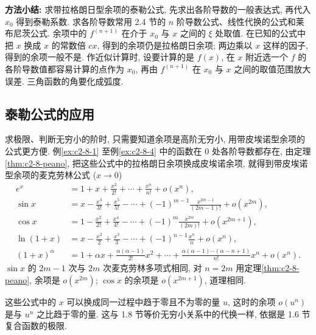 \documentclass[UTF8,openany]{ctexbook}
\theoremstyle{chinesetextbook}
\begin{document}
\par\indent\textbf{方法小结:} 求带拉格朗日型余项的泰勒公式, 先求出各阶导数的一般表达式, 再代入 $x_0$ 得到泰勒系数. 求各阶导数常用 2.4 节的 $n$ 阶导数公式、线性代换的公式和莱布尼茨公式. 余项中的 $f^{(n+1)}$ 在介于 $x_0$ 与 $x$ 之间的 $\xi$ 处取值. 在已知的公式中把 $x$ 换成 $x$ 的常数倍 $cx$, 得到的余项仍是拉格朗日余项; 两边乘以 $x$ 这样的因子, 得到的余项一般不是. 作近似计算时, 设要计算的是 $f(x)$, 在 $x$ 附近选一个 $f$ 的各阶导数值都容易计算的点作为 $x_0$, 再由 $f^{(n+1)}$ 在 $x_0$ 与 $x$ 之间的取值范围放大误差. 三角函数的角要化成弧度.
\subsection{泰勒公式的应用}
求极限、判断无穷小的阶时, 只需要知道余项是高阶无穷小, 用带皮埃诺型余项的公式更方便. 例\ref{ex:c2-8-1} 至例\ref{ex:c2-8-4} 中的函数在 $0$ 处各阶导数都存在, 由定理\ref{thm:c2-8-peano}, 把这些公式中的拉格朗日余项换成皮埃诺余项, 就得到带皮埃诺型余项的麦克劳林公式 ($x\to0$)
\[
\begin{aligned}
e^x&=1+x+\frac{x^2}{2!}+\cdots+\frac{x^n}{n!}+o(x^n),\\
\sin x&=x-\frac{x^3}{3!}+\frac{x^5}{5!}-\cdots+(-1)^{m-1}\frac{x^{2m-1}}{(2m-1)!}+o(x^{2m}),\\
\cos x&=1-\frac{x^2}{2!}+\frac{x^4}{4!}-\cdots+(-1)^m\frac{x^{2m}}{(2m)!}+o(x^{2m+1}),\\
\ln(1+x)&=x-\frac{x^2}2+\frac{x^3}3-\cdots+(-1)^{n-1}\frac{x^n}n+o(x^n),\\
(1+x)^\alpha&=1+\alpha x+\frac{\alpha(\alpha-1)}{2!}x^2+\cdots+\frac{\alpha(\alpha-1)\cdots(\alpha-n+1)}{n!}x^n+o(x^n).
\end{aligned}
\]
$\sin x$ 的 $2m-1$ 次与 $2m$ 次麦克劳林多项式相同, 对 $n=2m$ 用定理\ref{thm:c2-8-peano}, 余项是 $o(x^{2m})$; $\cos x$ 的余项是 $o(x^{2m+1})$, 道理相同.

这些公式中的 $x$ 可以换成同一过程中趋于零且不为零的量 $u$, 这时的余项 $o(u^n)$ 是与 $u^n$ 之比趋于零的量. 这与 1.8 节等价无穷小关系中的代换一样, 依据是 1.6 节复合函数的极限.
\end{document}

